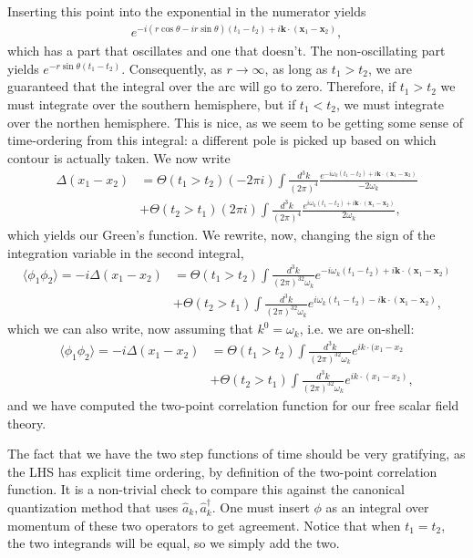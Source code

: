 \documentclass{../mathnotes}
\begin{document}
Inserting this point into the exponential in the numerator yields
\begin{align*}
    e^{-i(r\cos\theta-ir\sin\theta)(t_1-t_2)+i\mathbf{k}\cdot (\mathbf{x}_1-\mathbf{x}_2)},
\end{align*}
which has a part that oscillates and one that doesn't. The non-oscillating part yields $e^{-r\sin\theta(t_1-t_2)}$. Consequently, as $r\to\infty$,
as long as $t_1>t_2$, we are guaranteed that the integral over the arc will go to zero. Therefore, if $t_1>t_2$ we must integrate over the southern
hemisphere, but if $t_1<t_2$, we must integrate over the northen hemisphere. This is nice, as we seem to be getting some sense of time-ordering from
this integral: a different pole is picked up based on which contour is actually taken. We now write
\begin{align*}
    \Delta(x_1-x_2)&=\Theta(t_1>t_2)(-2\pi i)\int\frac{d^3k}{(2\pi)^4}\frac{e^{-i\omega_k(t_1-t_2)+i\mathbf{k}\cdot(\mathbf{x}_1-\mathbf{x}_2)}}{-2\omega_k}\\
    &+\Theta(t_2>t_1)(2\pi i)\int\frac{d^3k}{(2\pi)^4}\frac{e^{i\omega_k(t_1-t_2)+i\mathbf{k}\cdot(\mathbf{x}_1-\mathbf{x}_2)}}{2\omega_k},
\end{align*}
which yields our Green's function. We rewrite, now, changing the sign of the integration variable in the second integral,
\begin{align*}
    \langle\phi_1\phi_2\rangle=-i\Delta(x_1-x_2)&=\Theta(t_1>t_2)\int\frac{d^3k}{(2\pi)^32\omega_k}e^{-i\omega_k(t_1-t_2)+i\mathbf{k}\cdot(\mathbf{x}_1-\mathbf{x}_2)}\\
    &+\Theta(t_2>t_1)\int\frac{d^3k}{(2\pi)^32\omega_k}e^{i\omega_k(t_1-t_2)-i\mathbf{k}\cdot(\mathbf{x}_1-\mathbf{x}_2)},
\end{align*}
which we can also write, now assuming that $k^0=\omega_k$, i.e. we are on-shell:
\begin{align*}
    \langle\phi_1\phi_2\rangle=-i\Delta(x_1-x_2)&=\Theta(t_1>t_2)\int\frac{d^3k}{(2\pi)^32\omega_k}e^{ik\cdot(x_1-x_2}\\
    &+\Theta(t_2>t_1)\int\frac{d^3k}{(2\pi)^32\omega_k}e^{ik\cdot(x_1-x_2)},
\end{align*}
and we have computed the two-point correlation function for our free scalar field theory.

The fact that we have the two step functions of time should be very gratifying, as the LHS has explicit time ordering, by definition of the two-point
correlation function. It is a non-trivial check to compare this against the canonical quantization method that uses $\hat{a}_k,\hat{a}_k^\dagger$.
One must insert $\phi$ as an integral over momentum of these two operators to get agreement. Notice that when $t_1=t_2$, the two integrands will
be equal, so we simply add the two.
\end{document}
